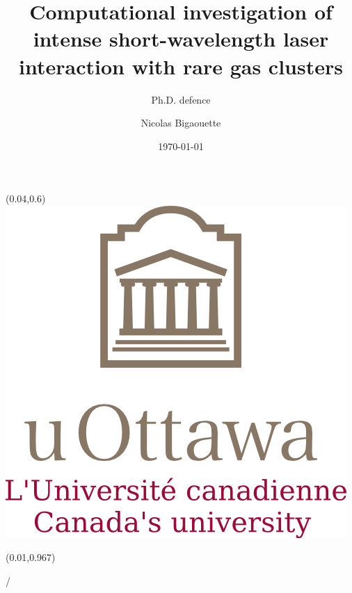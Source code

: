 \documentclass{beamer}
\title{Computational investigation of intense short-wavelength laser interaction with rare gas clusters}
\subtitle{Ph.D. defence}
\author{Nicolas Bigaouette}
\date[December 2013]{\today}
\institute{Computational Nanophotonics Group
\newline
Physics Department -- University of Ottawa}
\makeatletter
\newcommand{\framenumber}{
\begin{textblock}{0}(0.01,0.967)
\begin{scriptsize}
{\color{gray}\insertframenumber/\inserttotalframenumber}
\end{scriptsize}
\end{textblock}
}
\makeatother
\begin{document}
\begin{frame}{}
\titlepage
\begin{textblock}{0}(0.04,0.6)
\includegraphics[width=0.22\paperwidth]{figures/UofO}
\end{textblock}
\end{frame}

\setcounter{framenumber}{0}

\begin{frame}\framenumber
\tableofcontents
\end{frame}
\end{document}
